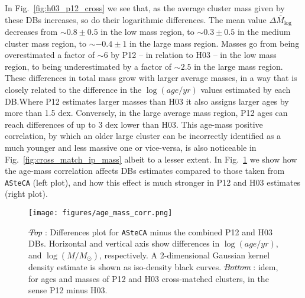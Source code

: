 \documentclass[draft]{aa}
\providecommand{\DIFaddtex}[1]{{\protect\color{blue}\uwave{#1}}} %
\providecommand{\DIFdeltex}[1]{{\protect\color{red}\sout{#1}}}                      %
\providecommand{\DIFaddFL}[1]{\DIFadd{#1}} %
\providecommand{\DIFdelFL}[1]{\DIFdel{#1}} %
\providecommand{\DIFaddbeginFL}{} %
\providecommand{\DIFaddendFL}{} %
\providecommand{\DIFdelbeginFL}{} %
\providecommand{\DIFdelendFL}{} %
\providecommand{\DIFadd}[1]{\texorpdfstring{\DIFaddtex{#1}}{#1}} %
\providecommand{\DIFdel}[1]{\texorpdfstring{\DIFdeltex{#1}}{}} %
\begin{document}
In Fig.~\ref{fig:h03_p12_cross} we see that, as the average cluster mass given
by these DBs increases, so do their logarithmic differences.
The mean value $\overline{\Delta M_{\log}}$ decreases from ${\sim}0.8\pm0.5$ in
the low mass region, to ${\sim}0.3\pm0.5$ in the medium cluster mass region, to
${\sim-}0.4\pm1$ in the large mass region. Masses go from being overestimated
a factor of ${\sim}6$ by P12 -- in relation to H03 -- in the low mass region, to
being underestimated by a factor of ${\sim}2.5$ in the large mass region.
%
These differences in total mass grow with larger average masses, in a way that
is closely related to the difference in the $\log(age/yr)$ values estimated by
each DB.\@ Where P12 estimates larger masses than H03 it also assigns larger
ages by more than 1.5 dex. Conversely, in the large average mass region, P12
ages can reach differences of up to 3 dex lower than H03.
%
This age-mass positive correlation, by which an older large cluster can be
incorrectly identified as a much younger and less massive one or vice-versa, is
also noticeable in Fig.~\ref{fig:cross_match_ip_mass} albeit to a lesser
extent. In Fig.~\ref{fig:age_mass_corr} we show how the age-mass correlation
affects DBs estimates compared to those taken from \texttt{ASteCA} (left plot),
and how this effect is much stronger in P12 and H03 estimates (right plot).

\begin{figure}
\centering
\texttt{[image: figures/age\_mass\_corr.png]}
\caption{\DIFdelbeginFL \emph{\DIFdelFL{Top}}%
\DIFdelendFL \DIFaddbeginFL \emph{\DIFaddFL{Left}}\DIFaddendFL : Differences plot for \texttt{ASteCA} minus the combined
P12 and H03 DBs. Horizontal and vertical axis show differences in
$\log(age/yr)$, and $\log(M/M_{\odot})$, respectively.
A 2-dimensional Gaussian kernel density estimate is shown as iso-density black
curves.
\DIFdelbeginFL \emph{\DIFdelFL{Bottom}}%
\DIFdelendFL \DIFaddbeginFL \emph{\DIFaddFL{Right}}\DIFaddendFL : idem, for ages and masses of P12 and H03 cross-matched clusters,
in the sense P12 minus H03.}
\label{fig:age_mass_corr}
\end{figure}
\end{document}
